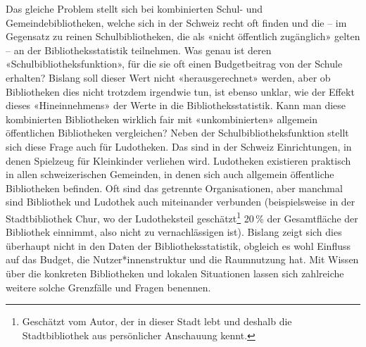 \documentclass[a4paper,
fontsize=11pt,
oneside,
numbers=noperiodatend,
parskip=half-,
bibliography=totoc,
final
]{scrartcl}
\begin{document}
Das gleiche Problem stellt sich bei kombinierten Schul- und
Gemeindebibliotheken, welche sich in der Schweiz recht oft finden und
die -- im Gegensatz zu reinen Schulbibliotheken, die als «nicht
öffentlich zugänglich» gelten -- an der Bibliotheksstatistik teilnehmen.
Was genau ist deren «Schulbibliotheksfunktion», für die sie oft einen
Budgetbeitrag von der Schule erhalten? Bislang soll dieser Wert nicht
«herausgerechnet» werden, aber ob Bibliotheken dies nicht trotzdem
irgendwie tun, ist ebenso unklar, wie der Effekt dieses «Hineinnehmens»
der Werte in die Bibliotheksstatistik. Kann man diese kombinierten
Bibliotheken wirklich fair mit «unkombinierten» allgemein öffentlichen
Bibliotheken vergleichen? Neben der Schulbibliotheksfunktion stellt sich
diese Frage auch für Ludotheken. Das sind in der Schweiz Einrichtungen,
in denen Spielzeug für Kleinkinder verliehen wird. Ludotheken existieren
praktisch in allen schweizerischen Gemeinden, in denen sich auch
allgemein öffentliche Bibliotheken befinden. Oft sind das getrennte
Organisationen, aber manchmal sind Bibliothek und Ludothek auch
miteinander verbunden (beispielsweise in der Stadtbibliothek Chur, wo
der Ludotheksteil geschätzt\footnote{Geschätzt vom Autor, der in dieser
  Stadt lebt und deshalb die Stadtbibliothek aus persönlicher Anschauung
  kennt.} 20\,\% der Gesamtfläche der Bibliothek einnimmt, also nicht zu
vernachlässigen ist). Bislang zeigt sich dies überhaupt nicht in den
Daten der Bibliotheksstatistik, obgleich es wohl Einfluss auf das
Budget, die Nutzer*innenstruktur und die Raumnutzung hat. Mit Wissen
über die konkreten Bibliotheken und lokalen Situationen lassen sich
zahlreiche weitere solche Grenzfälle und Fragen benennen.
\end{document}
